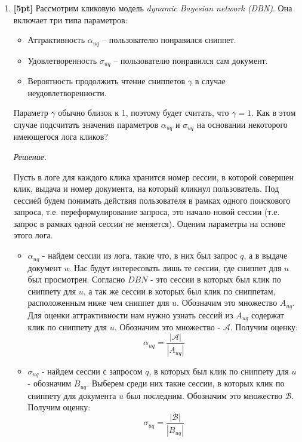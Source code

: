 \begin{enumerate}
	\item \textbf{[5pt]} Рассмотрим кликовую модель \textit{dynamic Bayesian network (DBN)}. Она 
	включает три типа параметров:
	
	\begin{itemize}
		\item Аттрактивность $\alpha_{uq}$ – пользователю понравился сниппет.
		\item Удовлетворенность $\sigma_{uq}$ – пользователю понравился сам документ.
		\item Вероятность продолжить чтение сниппетов $\gamma$ в случае неудовлетворенности.
	\end{itemize}
	
	Параметр $\gamma$ обычно близок к 1, поэтому будет считать, что $\gamma = 1$. Как в этом 
	случае подсчитать значения параметров $\alpha_{uq}$ и $\sigma_{uq}$ на основании некоторого 
	имеющегося лога кликов?
	
	\textit{Решение.}
	
	Пусть в логе для каждого клика хранится номер сессии, в которой совершен клик, выдача и номер документа, на который кликнул пользователь. Под сессией будем понимать действия пользователя в рамках одного поискового запроса, т.е. переформулирование запроса, это начало новой сессии (т.е. запрос в рамках одной сессии не меняется). Оценим параметры на основе этого лога.
	\begin{itemize}
		\item $\alpha_{uq}$ - найдем сессии из лога, такие что, в них был запрос $q$, а в выдаче документ $u$. Нас будут интересовать лишь те сессии, где сниппет для $u$ был просмотрен. Согласно $DBN$ - это сессии в которых был клик по сниппету для $u$, а так же сессии в которых был клик по сниппетам, расположенным ниже чем сниппет для $u$. Обозначим это множество $A_{uq}$. Для оценки аттрактивности нам нужно узнать сессий из $A_{uq}$ содержат клик по сниппету для $u$. Обозначим это множество - $\mathcal{A}$. Получим оценку:
		\begin{equation*}
			\alpha_{uq} = \frac{|\mathcal{A}|}{|A_{uq}|}
		\end{equation*}
		
		\item $\sigma_{uq}$ - найдем сессии с запросом $q$, в которых был клик по сниппету для $u$ - обозначим $B_{uq}$. Выберем среди них такие сессии, в которых клик по сниппету для документа $u$ был последним. Обозначим это множество $\mathcal{B}$. Получим оценку:
		\begin{equation*}
			\sigma_{uq} = \frac{|\mathcal{B}|}{|B_{uq}|}
		\end{equation*}
	\end{itemize}
\end{enumerate}
